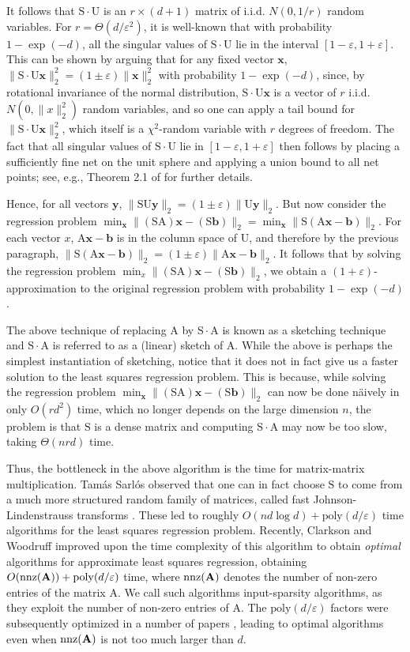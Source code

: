\documentclass[11pt]{article}
\newcommand{\mat}[1]{{\ensuremath{\bm{\mathrm{#1}}}}}
\def\b{{\mathbf b}}
\def\matA{\mat{A}}
\def\matS{\mat{S}}
\def\matU{\mat{U}}
\def\nnz{{ \rm nnz }}
\def\x{{\mathbf x}}
\def\y{{\mathbf y}}
\def\b{{\mathbf b}}
\newcommand{\eps}{\varepsilon}
\newcommand{\poly}{{\mathrm{poly}}}
\begin{document}
It follows that $\matS \cdot \matU$ is an $r \times (d+1)$ matrix of i.i.d. $N(0, 1/r)$
random variables. For $r = \Theta(d/\eps^2)$, it is well-known that with
probability $1-\exp(-d)$, all the singular
values of $\matS \cdot \matU$ lie in the interval 
$[1-\eps, 1+\eps]$. This can be shown by arguing that for any fixed vector $\x$, 
$\|\matS \cdot \matU \x\|_2^2 = (1 \pm \eps)\|\x\|_2^2$ with probability $1-\exp(-d)$, 
since, by rotational invariance of the normal distribution, 
$\matS \cdot \matU \x$ is a vector of $r$
i.i.d. $N(0, \|x\|_2^2)$ random variables, and so one can apply a tail bound for
$\|\matS \cdot \matU \x\|_2^2$, which itself is a $\chi^2$-random variable with $r$ degrees
of freedom. The fact that all singular values of $\matS \cdot \matU$ lie in 
$[1-\eps, 1+\eps]$ then follows by placing a sufficiently fine net on the unit sphere
and applying a union bound to all net points; 
see, e.g., Theorem 2.1 of \cite{RV10} for further details. 

Hence, for all vectors
$\y$, $\|\matS \matU \y\|_2 = (1 \pm \eps)\|\matU \y\|_2$. But now consider the regression
problem $\min_{\x} \|(\matS \matA)\x-(\matS \b)\|_2 = \min_{\x} \|\matS(\matA \x- \b)\|_2$. For each vector $x$,
$\matA \x- \b$ is in the column space of $\matU$, and therefore by the previous paragraph,
$\|\matS(\matA \x-\b)\|_2 = (1 \pm \eps)\|\matA \x-\b\|_2$. It follows that by solving the regression
problem $\min_x \|(\matS \matA)\x-(\matS \b)\|_2$, we obtain a $(1+\eps)$-approximation to the original
regression problem with probability $1-\exp(-d)$. 

The above technique of replacing $\matA$ by $\matS \cdot \matA$ is known as a sketching technique
and $\matS \cdot \matA$ is referred to as a (linear) sketch of $\matA$. While the above
is perhaps the simplest instantiation of sketching, notice that it does not in
fact give us a faster solution to the least squares regression problem. This is because,
while solving the regression problem $\min_{\x} \|(\matS \matA)\x-(\matS \b)\|_2$ can now be done n\"aively
in only $O(rd^2)$ time, which no longer depends on the large dimension $n$, the
problem is that $\matS$ is a dense matrix and computing $\matS \cdot \matA$ may now be too slow,
taking $\Theta(nrd)$ time. 

Thus, the bottleneck in the above algorithm is the time for matrix-matrix multiplication. 
Tam\'{a}s Sarl\'{o}s observed \cite{S06} that one can in fact
choose $\matS$ to come from a much more structured random family of matrices, called
fast Johnson-Lindenstrauss transforms \cite{AC06}. These led to roughly $O(nd \log d) + \poly(d/\eps)$
time algorithms for the least squares regression problem. Recently, Clarkson
and Woodruff \cite{CW13} improved upon the time complexity of this algorithm to obtain 
{\it optimal} algorithms for approximate least squares
regression, obtaining $O(\nnz(\matA)) + \poly(d/\eps)$ time, where $\nnz(\matA)$ denotes
the number of non-zero entries of the matrix $\matA$. We call such algorithms input-sparsity
algorithms, as they exploit the number of non-zero entries of $\matA$. 
The $\poly(d/\eps)$ factors
were subsequently optimized in a number of papers \cite{MM13,JH13,bn13}, leading to optimal algorithms
even when $\nnz(\matA)$ is not too much larger than $d$. 
\end{document}
